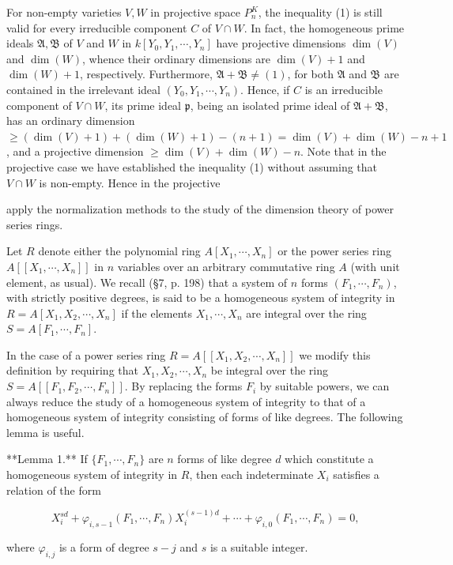 For non-empty varieties $V, W$ in projective space $P_n^K$, the inequality (1) is still valid for every irreducible component $C$ of $V \cap W$. In fact, the homogeneous prime ideals $\mathfrak{A}, \mathfrak{B}$ of $V$ and $W$ in $k[Y_0, Y_1, \cdots, Y_n]$ have projective dimensions $\dim(V)$ and $\dim(W)$, whence their ordinary dimensions are $\dim(V) + 1$ and $\dim(W) + 1$, respectively. Furthermore, $\mathfrak{A} + \mathfrak{B} \neq (1)$, for both $\mathfrak{A}$ and $\mathfrak{B}$ are contained in the irrelevant ideal $(Y_0, Y_1, \cdots, Y_n)$. Hence, if $C$ is an irreducible component of $V \cap W$, its prime ideal $\mathfrak{p}$, being an isolated prime ideal of $\mathfrak{A} + \mathfrak{B}$, has an ordinary dimension $\geq (\dim(V) + 1) + (\dim(W) + 1) - (n + 1) = \dim(V) + \dim(W) - n + 1$, and a projective dimension $\geq \dim(V) + \dim(W) - n$. Note that in the projective case we have established the inequality (1) without assuming that $V \cap W$ is non-empty. Hence in the projective

apply the normalization methods to the study of the dimension theory of power series rings.

Let $R$ denote either the polynomial ring $A[X_1, \cdots, X_n]$ or the power series ring $A[[X_1, \cdots, X_n]]$ in $n$ variables over an arbitrary commutative ring $A$ (with unit element, as usual). We recall (§7, p. 198) that a system of $n$ forms $(F_1, \cdots, F_n)$, with strictly positive degrees, is said to be a homogeneous system of integrity in $R = A[X_1, X_2, \cdots, X_n]$ if the elements $X_1, \cdots, X_n$ are integral over the ring $S = A[F_1, \cdots, F_n]$.

In the case of a power series ring $R = A[[X_1, X_2, \cdots, X_n]]$ we modify this definition by requiring that $X_1, X_2, \cdots, X_n$ be integral over the ring $S = A[[F_1, F_2, \cdots, F_n]]$. By replacing the forms $F_i$ by suitable powers, we can always reduce the study of a homogeneous system of integrity to that of a homogeneous system of integrity consisting of forms of like degrees. The following lemma is useful.

**Lemma 1.** If $\{F_1, \cdots, F_n\}$ are $n$ forms of like degree $d$ which constitute a homogeneous system of integrity in $R$, then each indeterminate $X_i$ satisfies a relation of the form

$$X_i^{sd} + \varphi_{i,s-1}(F_1, \cdots, F_n)X_i^{(s-1)d} + \cdots + \varphi_{i,0}(F_1, \cdots, F_n) = 0,$$

where $\varphi_{i,j}$ is a form of degree $s-j$ and $s$ is a suitable integer.

